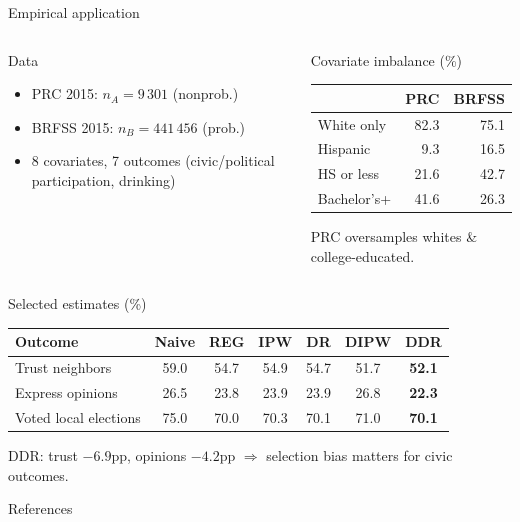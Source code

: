 \documentclass[aspectratio=169,11pt]{beamer}
\begin{document}
\begin{frame}{Empirical application}
\begin{columns}[T]
\begin{block}{Data}
\begin{itemize}
  \item PRC 2015: $n_A=9\,301$ (nonprob.)
  \item BRFSS 2015: $n_B=441\,456$ (prob.)
  \item 8 covariates, 7 outcomes (civic/political participation, drinking)
\end{itemize}
\end{block}
\begin{block}{Covariate imbalance (\%)}
\footnotesize
\begin{tabular}{lrr}
\toprule
& PRC & BRFSS \\
\midrule
White only  & 82.3 & 75.1 \\
Hispanic    & 9.3  & 16.5 \\
HS or less  & 21.6 & 42.7 \\
Bachelor's+ & 41.6 & 26.3 \\
\bottomrule
\end{tabular}

\small PRC oversamples whites \& college-educated.
\end{block}
\end{columns}
\vspace{-0.15cm}
\begin{block}{Selected estimates (\%)}
\footnotesize
\begin{tabular}{lcccccc}
\toprule
Outcome & Naive & REG & IPW & DR & DIPW & DDR \\
\midrule
Trust neighbors      & 59.0 & 54.7 & 54.9 & 54.7 & 51.7 & \textbf{52.1} \\
Express opinions     & 26.5 & 23.8 & 23.9 & 23.9 & 26.8 & \textbf{22.3} \\
Voted local elections& 75.0 & 70.0 & 70.3 & 70.1 & 71.0 & \textbf{70.1} \\
\bottomrule
\end{tabular}
\end{block}
\vspace{-0.15cm}
\begin{center}
\footnotesize DDR: trust $-6.9$pp, opinions $-4.2$pp $\Rightarrow$ selection bias matters for civic outcomes.
\end{center}
\end{frame}

\begin{frame}[allowframebreaks]{References}
\nocite{*}
\printbibliography
\end{frame}
\end{document}
